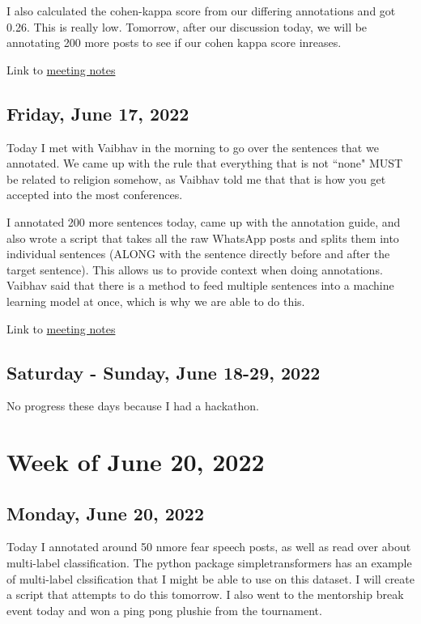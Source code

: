 \documentclass[11pt,letterpaper]{article}
\begin{document}
I also calculated the cohen-kappa score from our differing annotations and got 0.26. This is really low. Tomorrow, after our discussion today, we will be annotating 200 more posts to see if our cohen kappa score inreases.

Link to \href{https://docs.google.com/document/d/1ZV9jps3gLQnBNUDG9ZCDrG-zob538XkiNL1clB8kYK8/edit?usp=sharing}{meeting notes}

\subsection{Friday, June 17, 2022}
Today I met with Vaibhav in the morning to go over the sentences that we annotated. We came up with the rule that everything that is not ``none" MUST be related to religion somehow, as Vaibhav told me that that is how you get accepted into the most conferences. 

I annotated 200 more sentences today, came up with the annotation guide, and also wrote a script that takes all the raw WhatsApp posts and splits them into individual sentences (ALONG with the sentence directly before and after the target sentence). This allows us to provide context when doing annotations. Vaibhav said that there is a method to feed multiple sentences into a machine learning model at once, which is why we are able to do this.

Link to \href{https://docs.google.com/document/d/1oBA7dLgPfAtDW8P7GTJky1KsGvf8_E19y6jDpj0e1SA/edit?usp=sharing}{meeting notes}

\subsection{Saturday - Sunday, June 18-29, 2022}
No progress these days because I had a hackathon.

\section{Week of June 20, 2022}
\subsection{Monday, June 20, 2022}
Today I annotated around 50 nmore fear speech posts, as well as read over about multi-label classification. The python package simpletransformers has an example of multi-label clssification that I might be able to use on this dataset. I will create a script that attempts to do this tomorrow. I also went to the mentorship break event today and won a ping pong plushie from the tournament.
\end{document}
